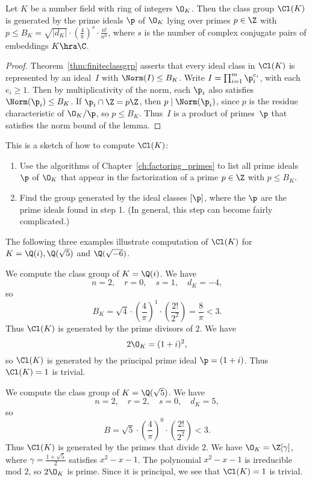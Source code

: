 \begin{lemma}
Let $K$ be a number field with ring of integers $\O_K$.  Then the
class group $\Cl(K)$ is generated by the prime ideals $\p$ of $\O_K$
lying over primes $p\in\Z$ with $p\leq B_K = \sqrt{|d_K|}\cdot
\left(\frac{4}{\pi}\right)^s\cdot \frac{n!}{n^n}$,
where $s$ is the number of complex conjugate pairs of embeddings
$K\hra\C$.
\end{lemma}
\begin{proof}
Theorem~\ref{thm:finiteclassgrp}
asserts that every ideal class in $\Cl(K)$ is represented by
an ideal~$I$ with $\Norm(I)\leq B_K$.  Write $I=\prod_{i=1}^m
\p_i^{e_i}$, with each $e_i\geq 1$.  Then by multiplicativity of the
norm, each $\p_i$ also satisfies $\Norm(\p_i)\leq B_K$.  If $\p_i \cap
\Z=p\Z$, then $p\mid \Norm(\p_i)$, since $p$ is the residue
characteristic of $\O_K/\p$, so $p\leq B_K$. Thus~$I$ is a product of
primes~$\p$ that satisfies the norm bound of the lemma.
\end{proof}

This is a sketch of how to compute $\Cl(K)$:
\begin{enumerate}
\item Use the algorithms of Chapter~\ref{ch:factoring_primes} to list all
prime ideals $\p$ of $\O_K$ that appear in the factorization
of a prime $p\in \Z$ with $p\leq B_K$.
\item Find the group generated  by the ideal
classes $[\p]$, where the $\p$ are the prime ideals
found in step 1.  (In general, this step can become
fairly complicated.)
\end{enumerate}
The following three examples illustrate computation of $\Cl(K)$
for $K=\Q(i), \Q(\sqrt{5})$ and $\Q(\sqrt{-6})$.
\begin{example}
We compute the class group of $K=\Q(i)$.  We have
$$
  n = 2, \quad r=0, \quad s=1, \quad d_K = -4,
$$
so
$$
  B_K = \sqrt{4}\cdot \left(\frac{4}{\pi}\right)^1
   \cdot\left(\frac{2!}{2^2}\right) = \frac{8}{\pi} <3.
$$
Thus $\Cl(K)$ is generated by the prime divisors
of $2$.  We have
$$
 2\O_K = (1+i)^2,
$$
so $\Cl(K)$ is generated by the principal prime
ideal $\p=(1+i)$. Thus $\Cl(K)=1$ is trivial.
\end{example}

\begin{example}
We compute the class group of $K=\Q(\sqrt{5})$.
We have
$$
  n = 2, \quad r = 2, \quad s=0, \quad d_K = 5,
$$
so $$B = \sqrt{5}\cdot \left(\frac{4}{\pi}\right)^0\cdot
\left(\frac{2!}{2^2}\right)  < 3.$$
Thus $\Cl(K)$ is generated by the primes that divide $2$.
We have $\O_K=\Z[\gamma]$, where $\gamma=\frac{1+\sqrt{5}}{2}$
satisfies $x^2-x-1$.   The polynomial $x^2-x-1$ is irreducible
mod $2$, so $2\O_K$ is prime.  Since it is principal, we see
that $\Cl(K)=1$ is trivial.
\end{example}

